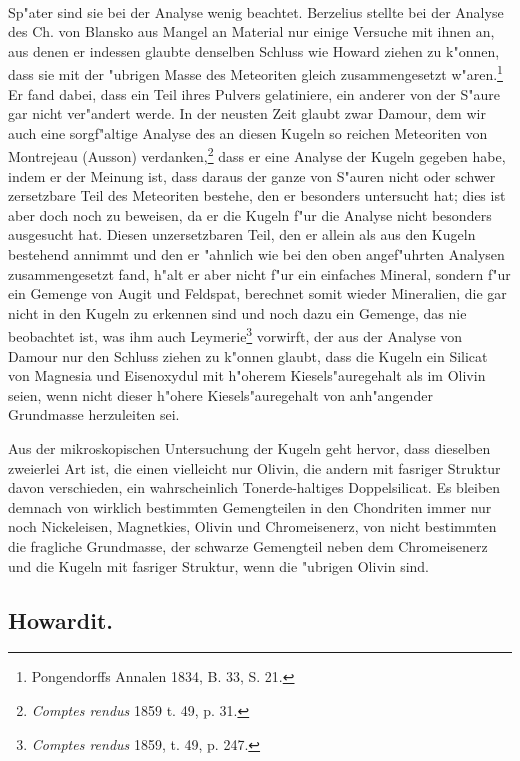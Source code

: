 \documentclass[a4paper, 11pt, oneside]{article}
\begin{document}
\paragraph{}
Sp"ater sind sie bei der Analyse wenig beachtet. Berzelius stellte bei der Analyse des Ch. von Blansko aus Mangel an Material nur einige Versuche mit ihnen an, aus denen er indessen glaubte denselben Schluss wie Howard ziehen zu k"onnen, dass sie mit der "ubrigen Masse des Meteoriten gleich zusammengesetzt w"aren.\footnote{Pongendorffs Annalen 1834, B. 33, S. 21.} Er fand dabei, dass ein Teil ihres Pulvers gelatiniere, ein anderer von der S"aure gar nicht ver"andert werde. In der neusten Zeit glaubt zwar Damour, dem wir auch eine sorgf"altige Analyse des an diesen Kugeln so reichen Meteoriten von Montrejeau (Ausson) verdanken,\footnote{\emph{Comptes rendus} 1859 t. 49, p. 31.} dass er eine Analyse der Kugeln gegeben habe, indem er der Meinung ist, dass daraus der ganze von S"auren nicht oder schwer zersetzbare Teil des Meteoriten bestehe, den er besonders untersucht hat; dies ist aber doch noch zu beweisen, da er die Kugeln f"ur die Analyse nicht besonders ausgesucht hat. Diesen unzersetzbaren Teil, den er allein als aus den Kugeln bestehend annimmt und den er "ahnlich wie bei den oben angef"uhrten Analysen zusammengesetzt fand, h"alt er aber nicht f"ur ein einfaches Mineral, sondern f"ur ein Gemenge von Augit und Feldspat, berechnet somit wieder Mineralien, die gar nicht in den Kugeln zu erkennen sind und noch dazu ein Gemenge, das nie beobachtet ist, was ihm auch Leymerie\footnote{\emph{Comptes rendus} 1859, t. 49, p. 247.} vorwirft, der aus der Analyse von Damour nur den Schluss ziehen zu k"onnen glaubt, dass die Kugeln ein Silicat von Magnesia und Eisenoxydul mit h"oherem Kiesels"auregehalt als im Olivin seien, wenn nicht dieser h"ohere Kiesels"auregehalt von anh"angender Grundmasse herzuleiten sei.

Aus der mikroskopischen Untersuchung der Kugeln geht hervor, dass dieselben zweierlei Art ist, die einen vielleicht nur Olivin, die andern mit fasriger Struktur davon verschieden, ein wahrscheinlich Tonerde-haltiges Doppelsilicat. Es bleiben demnach von wirklich bestimmten Gemengteilen in den Chondriten immer nur noch Nickeleisen, Magnetkies, Olivin und Chromeisenerz, von nicht bestimmten die fragliche Grundmasse, der schwarze Gemengteil neben dem Chromeisenerz und die Kugeln mit fasriger Struktur, wenn die "ubrigen Olivin sind.
\subsection{Howardit.}
\end{document}
